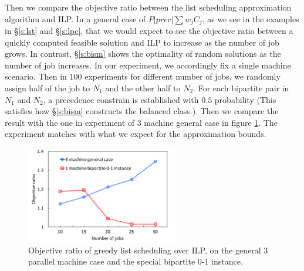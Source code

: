 Then we compare the objective ratio between the list scheduling approximation algorithm and ILP. In a general case of $P|prec|\sum w_j C_j$, as we see in the examples in \S\ref{s:lst} and \S\ref{s:lpc}, that we would expect to see the objective ratio between a quickly computed feasible solution and ILP to increase as the number of job grows. In contrast, \S\ref{s:bism} shows the optimality of random solutions as the number of job increases. In our experiment, we accordingly fix a single machine scenario. Then in 100 experiments for different number of jobs, we randomly assign half of the job to $N_1$ and the other half to $N_2$. For each bipartite pair in $N_1$ and $N_2$, a precedence constrain is established with $0.5$ probability (This satisfies how \S\ref{s:bism} constructs the balanced class.). Then we compare the result with the one in experiment of 3 machine general case in figure \ref{fig:obj_ratio}. The experiment matches with what we expect for the approximation bounds.

\begin{figure}[h]
	\centering
	\includegraphics[width=0.6\textwidth]{figs/obj_ratio.pdf}
	\caption{Objective ratio of greedy list scheduling over ILP, on the general 3 parallel machine case and the special bipartite 0-1 instance.}
	\label{fig:obj_ratio}
\end{figure}
